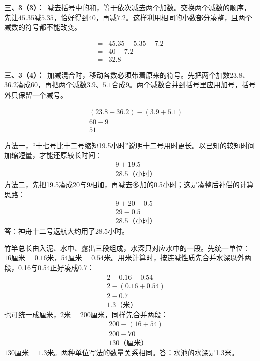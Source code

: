 \documentclass[multi=snippet,border=0pt]{standalone}
\newenvironment{snippet}[3]{\begin{minipage}{#1bp}\color{answerred}\fontsize{#2}{#3}\selectfont\raggedright}{\end{minipage}}
\begin{document}
\begin{snippet}{505}{11.5}{14}\textbf{三、3（3）：}\ 减去括号中的和，等于依次减去两个加数。交换两个减数的顺序，先让\(45.35\)减\(5.35\)，恰好得到40，再减\(7.2\)。这样利用相同的小数部分凑整，且两个减数的符号都不能改变。\end{snippet}
\begin{snippet}{208.00000000000003}{10.5}{12.8}\[\begin{aligned}={}&45.35-5.35-7.2\\={}&40-7.2\\={}&32.8\end{aligned}\]\end{snippet}
\begin{snippet}{505}{11.5}{14}\textbf{三、3（4）：}\ 加减混合时，移动各数必须带着原来的符号。先把两个加数\(23.8\)、\(36.2\)凑成60，再把两个减数\(3.9\)、\(5.1\)合成9。两个减数合并到括号里应用加号，括号外只保留一个减号。\end{snippet}
\begin{snippet}{279.0}{10.5}{12.8}\[\begin{aligned}={}&(23.8+36.2)-(3.9+5.1)\\={}&60-9\\={}&51\end{aligned}\]\end{snippet}
\begin{snippet}{505}{11.5}{14}方法一，“十七号比十二号缩短19.5小时”说明十二号用时更长。以已知的较短时间加缩短量，才能还原较长时间：\[\begin{aligned}&9+19.5\\={}&28.5\text{（小时）}\end{aligned}\]方法二，先把19.5凑成20与9相加，再减去多加的0.5小时；这是凑整后补偿的计算思路：\[\begin{aligned}&9+20-0.5\\={}&29-0.5\\={}&28.5\text{（小时）}\end{aligned}\]答：神舟十二号返航大约用了28.5小时。\end{snippet}
\begin{snippet}{505}{11.5}{14}竹竿总长由入泥、水中、露出三段组成，水深只对应水中的一段。先统一单位：\(16\text{厘米}=0.16\text{米}\)，\(54\text{厘米}=0.54\text{米}\)。用米计算时，按连减性质先合并水深以外两段，0.16与0.54正好凑成0.7：\[\begin{aligned}&2-0.16-0.54\\={}&2-(0.16+0.54)\\={}&2-0.7\\={}&1.3\text{（米）}\end{aligned}\]也可统一成厘米，\(2\text{米}=200\text{厘米}\)，同样先合并两段：\[\begin{aligned}&200-(16+54)\\={}&200-70\\={}&130\text{（厘米）}\end{aligned}\]\(130\text{厘米}=1.3\text{米}\)。两种单位写法的数量关系相同。答：水池的水深是1.3米。\end{snippet}
\end{document}
